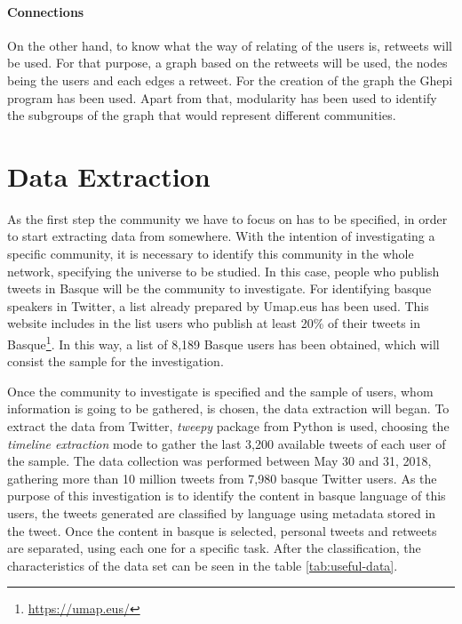 \documentclass[information,article,submit,moreauthors,pdftex,10pt,a4paper]{Definitions/mdpi}
\begin{document}
\paragraph{Connections}

On the other hand, to know what the way of relating of the users is, retweets will be used. For that purpose, a graph based on the retweets will be used, the nodes being the users and each edges a retweet. For the creation of the graph the Ghepi program \citep{bastian2009gephi} has been used. Apart from that, modularity \citep{blondel2008fast} has been used to identify the subgroups of the graph that would represent different communities.



\section{Data Extraction}\label{sec:data-extraction}

\indent As the first step the community we have to focus on has to be specified, in order to start extracting data from somewhere. With the intention of investigating a specific community, it is necessary to identify this community in the whole network, specifying the universe to be studied. In this case, people who publish tweets in Basque will be the community to investigate. For identifying basque speakers in Twitter, a list already prepared by Umap.eus has been used. This website includes in the list users who publish at least 20\% of their tweets in Basque\footnote{\url{https://umap.eus/}}. In this way, a list of 8,189 Basque users has been obtained, which will consist the sample for the investigation.

Once the community to investigate is specified and the sample of users, whom information is going to be gathered, is chosen, the data extraction will began. To extract the data from Twitter, \textit{tweepy} package from Python is used, choosing the \textit{timeline extraction} mode to gather the last 3,200 available tweets of each user of the sample. The data collection was performed between May 30 and 31, 2018, gathering more than 10 million tweets from 7,980 basque Twitter users. As the purpose of this investigation is to identify the content in basque language of this users, the tweets generated are classified by language using metadata stored in the tweet. Once the content in basque is selected, personal tweets and retweets are separated, using each one for a specific task. After the classification, the characteristics of the data set can be seen in the table \ref{tab:useful-data}.
\end{document}
